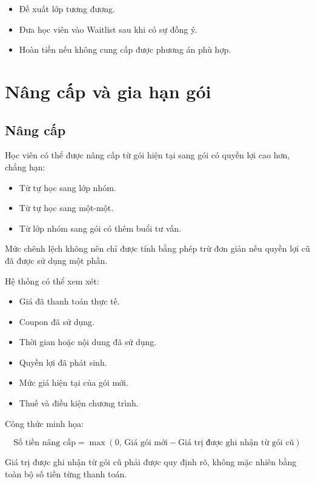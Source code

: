 \documentclass[12pt,a4paper]{article}
\begin{document}
\begin{itemize}
    \item Đề xuất lớp tương đương.
    \item Đưa học viên vào Waitlist sau khi có sự đồng ý.
    \item Hoàn tiền nếu không cung cấp được phương án phù hợp.
\end{itemize}

\section{Nâng cấp và gia hạn gói}

\subsection{Nâng cấp}

Học viên có thể được nâng cấp từ gói hiện tại sang gói có quyền lợi cao hơn,
chẳng hạn:

\begin{itemize}
    \item Từ tự học sang lớp nhóm.
    \item Từ tự học sang một-một.
    \item Từ lớp nhóm sang gói có thêm buổi tư vấn.
\end{itemize}

Mức chênh lệch không nên chỉ được tính bằng phép trừ đơn giản
nếu quyền lợi cũ đã được sử dụng một phần.

Hệ thống có thể xem xét:

\begin{itemize}
    \item Giá đã thanh toán thực tế.
    \item Coupon đã sử dụng.
    \item Thời gian hoặc nội dung đã sử dụng.
    \item Quyền lợi đã phát sinh.
    \item Mức giá hiện tại của gói mới.
    \item Thuế và điều kiện chương trình.
\end{itemize}

Công thức minh họa:

\[
\text{Số tiền nâng cấp}
=
\max\left(
0,\,
\text{Giá gói mới}
-
\text{Giá trị được ghi nhận từ gói cũ}
\right)
\]

Giá trị được ghi nhận từ gói cũ phải được quy định rõ,
không mặc nhiên bằng toàn bộ số tiền từng thanh toán.
\end{document}
